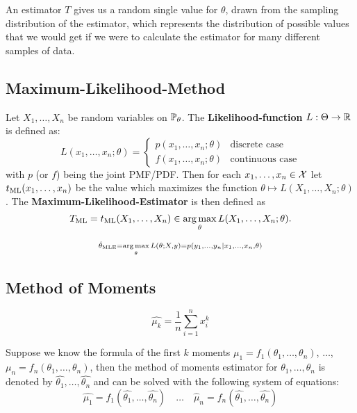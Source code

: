 An estimator $T$ gives us a random single value for $\theta$, drawn from the sampling distribution of the estimator, which represents the distribution of possible values that we would get if we were to calculate the estimator for many different samples of data.

\subsection{Maximum-Likelihood-Method}
Let \(X_1, \ldots, X_n\) be random variables on \(\P_\theta\). The \textbf{Likelihood-function} \(L: \Theta \to \R\) is defined as:
\[L(x_1, \ldots, x_n ; \theta) = \begin{cases}
  p(x_1, \ldots, x_n ; \theta) & \text{discrete case} \\
  f(x_1, \ldots, x_n ; \theta) & \text{continuous case}
\end{cases}\]
with \(p\) (or \(f\)) being the joint PMF/PDF.
Then for each \(x_1, \ldots, x_n \in \DX\) let \(t_{\ML}(x_1, \ldots, x_n)\) be the value which maximizes the function \(\theta \mapsto L(X_1, \ldots, X_n ; \theta)\).
The \textbf{Maximum-Likelihood-Estimator} is then defined as
\[T_{\ML} = t_{\ML}(X_1, \ldots, X_n) \in \underset{\theta}{\arg\max} \, L(X_1, \ldots, X_n ; \theta).\]

\begin{note*}
  \[\scriptstyle \hat{\theta}_{\MLE} = \underset{\theta}{\arg\max} \, L(\theta; X, y) = p(y_1, \ldots, y_n \mid x_1, \ldots, x_n, \theta)\]
\end{note*}

\subsection{Method of Moments}
\begin{definition*}
  \[\hat{\mu_k} = \frac{1}{n} \sum_{i=1}^n x_i^k\]
\end{definition*}

Suppose we know the formula of the first \(k\) moments \(\mu_1 = f_1(\theta_1, \ldots, \theta_n)\), \(\ldots\), \(\mu_n = f_n(\theta_1, \ldots, \theta_n)\), then the method of moments estimator for \(\theta_1, \ldots, \theta_n\) is denoted by \(\hat{\theta_1}, \ldots, \hat{\theta_n}\) and can be solved with the following system of equations:
\[\hat{\mu_1} = f_1(\hat{\theta_1}, \ldots, \hat{\theta_n}) \quad \ldots \quad \hat{\mu}_n = f_n(\hat{\theta_1}, \ldots, \hat{\theta_n})\]

